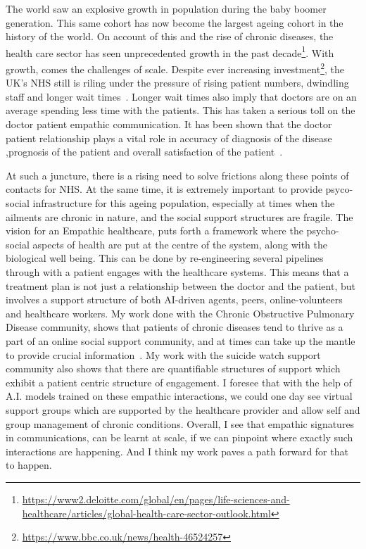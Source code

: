 The world saw an explosive growth in population during the baby boomer generation. This same cohort has now become the largest ageing cohort in the history of the world. On account of this and the rise of chronic diseases, the health care sector has seen unprecedented growth in the past decade\footnote{\url{https://www2.deloitte.com/global/en/pages/life-sciences-and-healthcare/articles/global-health-care-sector-outlook.html}}. With growth, comes the challenges of scale. Despite ever increasing investment\footnote{\url{https://www.bbc.co.uk/news/health-46524257}}, the UK's NHS still is riling under the pressure of rising patient numbers, dwindling staff and longer wait times~\cite{mayor2018nhs}. Longer wait times also imply that doctors are on an average spending less time with the patients. This has taken a serious toll on the doctor patient empathic communication. It has been shown that the doctor patient relationship plays a vital role in accuracy of diagnosis of the disease ,prognosis of the patient and overall satisfaction of the patient~\cite{jagosh2011importance,bensing1991doctor}.

At such a juncture, there is a rising need to solve frictions along these points of contacts for NHS. At the same time, it is extremely important to provide psyco-social infrastructure for this ageing population, especially at times when the ailments are chronic in nature, and the social support structures are fragile. 
The vision for an Empathic healthcare, puts forth a framework where the psycho-social aspects of health are put at the centre of the system, along with the biological well being. This can be done by re-engineering several pipelines through with a patient engages with the healthcare systems. This means that a treatment plan is not just a relationship between the doctor and the patient, but involves a support structure of both AI-driven agents, peers, online-volunteers and healthcare workers. My work done with the Chronic Obstructive Pulmonary Disease community, shows that patients of chronic diseases tend to thrive as a part of an online social support community, and at times can take up the mantle to provide crucial information~\cite{joglekar2018online}. My work with the suicide watch support community also shows that there are quantifiable structures of support which exhibit a patient centric structure of engagement. I foresee that with the help of A.I. models trained on these empathic interactions, we could one day see virtual support groups which are supported by the healthcare provider and allow self and group management of chronic conditions. Overall, I see that empathic signatures in communications, can be learnt at scale, if we can pinpoint where exactly such interactions are happening. And I think my work paves a path forward for that to happen. 


